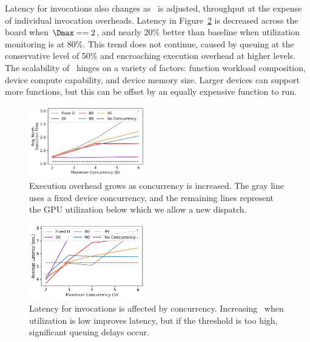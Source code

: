 Latency for invocations also changes as \D~is adjusted, throughput at the expense of individual invocation overheads.
Latency in Figure~\ref{fig:concur-e2e} is decreased across the board when $\Dmax==2$, and nearly 20\% better than baseline when utilization monitoring is at 80\%.
This trend does not continue, caused by queuing at the conservative level of 50\% and encroaching execution overhead at higher levels.
The scalability of \D~hinges on a variety of factors: function workload composition, device compute capability, and device memory size.
Larger devices can support more functions, but this can be offset by an equally expensive function to run.

\begin{figure}
  \includegraphics[width=0.45\textwidth]{../graphs/concurrency/25.7/paper_exec_overhead.pdf}
  \vspace*{\captionspace}
  \caption{Execution overhead grows as concurrency is increased.
  The gray line uses a fixed device concurrency, and the remaining lines represent the GPU utilization below which we allow a new dispatch.}
    \label{fig:concur-exec-overhead}
    \vspace{\myfigspace}
\end{figure}
\begin{figure}
  \includegraphics[width=0.45\textwidth]{../graphs/concurrency/25.7/paper_e2e_sec.pdf}
  \vspace*{\captionspace}
  \caption{Latency for invocations is affected by concurrency.
  Increasing \D~when utilization is low improves latency, but if the threshold is too high, significant queuing delays occur.}
  \label{fig:concur-e2e}
  \vspace{-0.5cm}
\end{figure}
